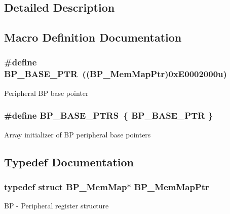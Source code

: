 \subsection{Detailed Description}


\subsection{Macro Definition Documentation}
\hypertarget{group___b_p___peripheral_ga375cd6d2e7ec414f4e33cb54d5494940}{}
\subsubsection[{B\+P\+\_\+\+B\+A\+S\+E\+\_\+\+P\+T\+R}]{\setlength{\rightskip}{0pt plus 5cm}\#define B\+P\+\_\+\+B\+A\+S\+E\+\_\+\+P\+T\+R~(({\bf B\+P\+\_\+\+Mem\+Map\+Ptr})0x\+E0002000u)}\label{group___b_p___peripheral_ga375cd6d2e7ec414f4e33cb54d5494940}
Peripheral B\+P base pointer \hypertarget{group___b_p___peripheral_ga6c07114ad41ccb42b134e8834f123598}{}
\subsubsection[{B\+P\+\_\+\+B\+A\+S\+E\+\_\+\+P\+T\+R\+S}]{\setlength{\rightskip}{0pt plus 5cm}\#define B\+P\+\_\+\+B\+A\+S\+E\+\_\+\+P\+T\+R\+S~\{ {\bf B\+P\+\_\+\+B\+A\+S\+E\+\_\+\+P\+T\+R} \}}\label{group___b_p___peripheral_ga6c07114ad41ccb42b134e8834f123598}
Array initializer of B\+P peripheral base pointers 

\subsection{Typedef Documentation}
\hypertarget{group___b_p___peripheral_gaa250950ffe336f8c6e5895e3a1e4ca86}{}
\subsubsection[{B\+P\+\_\+\+Mem\+Map\+Ptr}]{\setlength{\rightskip}{0pt plus 5cm}typedef struct {\bf B\+P\+\_\+\+Mem\+Map}$\ast$ {\bf B\+P\+\_\+\+Mem\+Map\+Ptr}}\label{group___b_p___peripheral_gaa250950ffe336f8c6e5895e3a1e4ca86}
B\+P -\/ Peripheral register structure 